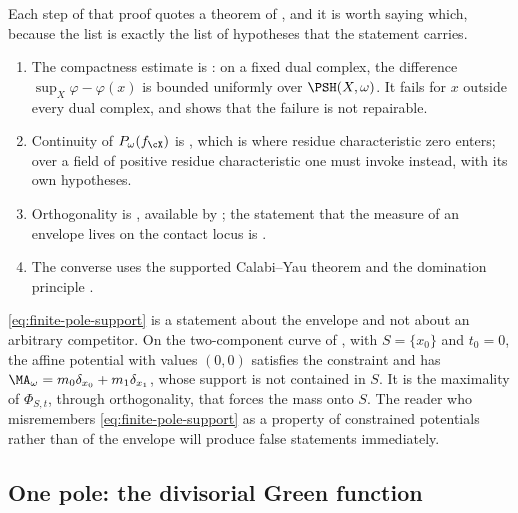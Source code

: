 Each step of that proof quotes a theorem of , and it is worth
saying which, because the list is exactly the list of hypotheses that the
statement carries.

\begin{enumerate}
\item\label{itm:ch31-pole:compact}
 The compactness estimate is
 : on a fixed dual complex, the
 difference \(\sup_X\varphi-\varphi(x)\) is bounded uniformly over
 \(\PSH(X,\omega)\).  It fails for \(x\) outside every dual complex, and
  shows that the failure is not repairable.
\item\label{itm:ch31-pole:envelope}
 Continuity of \(P_\omega(f_{\cX})\) is
 , which is where residue characteristic
 zero enters; over a field of positive residue characteristic one must
 invoke  instead, with its own
 hypotheses.
\item\label{itm:ch31-pole:orth}
 Orthogonality is , available by
 ; the statement that the measure of an
 envelope lives on the contact locus is
 .
\item\label{itm:ch31-pole:cy}
 The converse uses the supported Calabi--Yau theorem
  and the domination principle
 .
\end{enumerate}

\begin{remark}
\label{rem:ch31-why-supremum}
\eqref{eq:finite-pole-support} is a statement about the envelope and not
about an arbitrary competitor.  On the two-component curve of
, with \(S=\{x_0\}\) and \(t_0=0\), the
affine potential with values \((0,0)\) satisfies the constraint and has
\(\MA_\omega=m_0\delta_{x_0}+m_1\delta_{x_1}\), whose support is not
contained in \(S\).  It is the maximality of \(\Phi_{S,t}\), through
orthogonality, that forces the mass onto \(S\).  The reader who
misremembers \eqref{eq:finite-pole-support} as a property of constrained
potentials rather than of the envelope will produce false statements
immediately.
\end{remark}

\subsection{One pole: the divisorial Green function}
\label{sec:ch31-one-pole}

